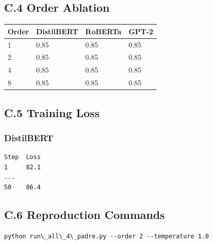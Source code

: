 \subsection{C.4 Order Ablation}

\begin{table}[H]
\centering
\small
\begin{tabular}{llll}
\toprule
\textbf{Order} & \textbf{DistilBERT} & \textbf{RoBERTa} & \textbf{GPT-2} \\
\midrule
1 & 0.85 & 0.85 & 0.85 \\
2 & 0.85 & 0.85 & 0.85 \\
4 & 0.85 & 0.85 & 0.85 \\
8 & 0.85 & 0.85 & 0.85 \\
\bottomrule
\end{tabular}
\end{table}

\subsection{C.5 Training Loss}

\subsubsection{DistilBERT}
\begin{lstlisting}
Step  Loss
1     82.1
...
50    86.4
\end{lstlisting}

\subsection{C.6 Reproduction Commands}

\begin{lstlisting}
python run\_all\_4\_padre.py --order 2 --temperature 1.0
\end{lstlisting}

